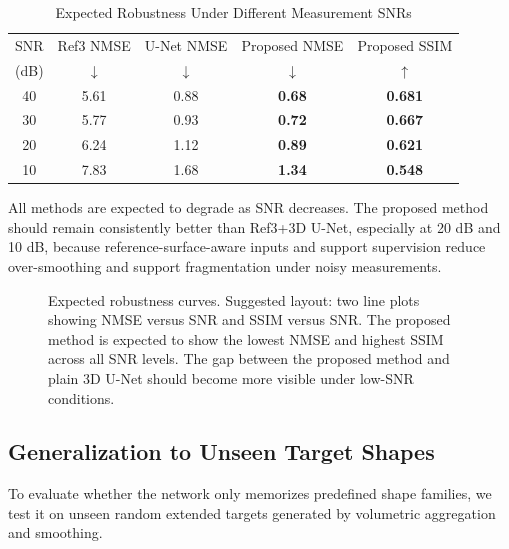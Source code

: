 \documentclass[journal]{IEEEtran}
\begin{document}
\begin{table}[t]
\caption{Expected Robustness Under Different Measurement SNRs}
\label{tab:noise_robustness}
\centering
\begin{tabular}{ccccc}
\hline
SNR & Ref3 NMSE & U-Net NMSE & Proposed NMSE & Proposed SSIM \\
(dB) & $\downarrow$ & $\downarrow$ & $\downarrow$ & $\uparrow$ \\
\hline
40 & 5.61 & 0.88 & \textbf{0.68} & \textbf{0.681} \\
30 & 5.77 & 0.93 & \textbf{0.72} & \textbf{0.667} \\
20 & 6.24 & 1.12 & \textbf{0.89} & \textbf{0.621} \\
10 & 7.83 & 1.68 & \textbf{1.34} & \textbf{0.548} \\
\hline
\end{tabular}
\end{table}

All methods are expected to degrade as SNR decreases. The proposed method should remain consistently better than Ref3+3D U-Net, especially at 20 dB and 10 dB, because reference-surface-aware inputs and support supervision reduce over-smoothing and support fragmentation under noisy measurements.

\begin{figure}[t]
\centering
{}
\caption{Expected robustness curves. Suggested layout: two line plots showing NMSE versus SNR and SSIM versus SNR. The proposed method is expected to show the lowest NMSE and highest SSIM across all SNR levels. The gap between the proposed method and plain 3D U-Net should become more visible under low-SNR conditions.}
\label{fig:noise_robustness_curves}
\end{figure}

\subsection{Generalization to Unseen Target Shapes}
\label{subsec:unseen_shapes}

To evaluate whether the network only memorizes predefined shape families, we test it on unseen random extended targets generated by volumetric aggregation and smoothing.
\end{document}
